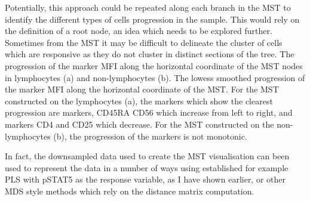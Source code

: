 Potentially, this approach could be repeated along each branch in the \gls{MST} to identify the different types of cells progression in the sample.
This would rely on the definition of a root node, an idea which needs to be explored further.
Sometimes from the MST it may be difficult to delineate the cluster of cells which are responsive as they do not cluster in distinct sections of the tree.
{ The progression of the marker MFI along the horizontal coordinate of the \gls{MST} nodes in lymphocytes (a) and non-lymphocytes (b). }
{
  The lowess smoothed progression of the marker MFI along the horizontal coordinate of the \gls{MST}.
  For the \gls{MST} constructed on the lymphocytes (a), the markers which show the clearest progression are markers, CD45RA
  CD56 which increase from left to right,
  and markers CD4 and CD25 which decrease.
  For the \gls{MST} constructed on the non-lymphocytes (b), the progression of the markers is not monotonic.
}


In fact, the downsampled data used to create the \gls{MST} visualisation can been used to represent the data in a number of ways using established
for example \gls{PLS} with pSTAT5 as the response variable, as I have shown earlier, or other \gls{MDS} style methods which rely on the distance matrix computation.  

